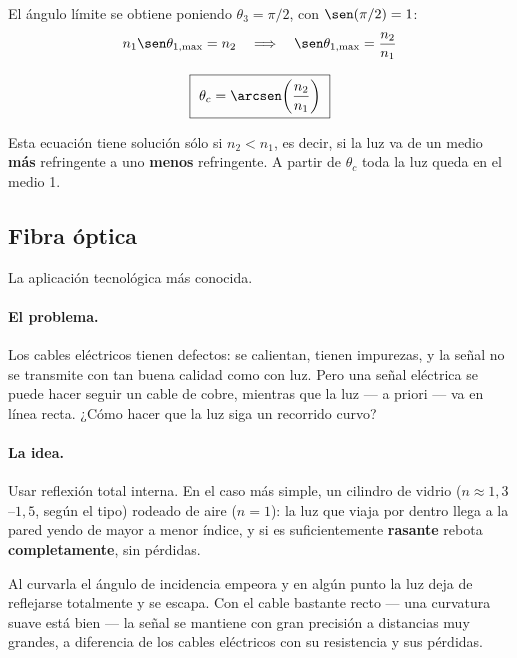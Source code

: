 \documentclass[12pt,a4paper]{article}
\begin{document}
El ángulo límite se obtiene poniendo $\theta_3 = \pi/2$, con $\sen(\pi/2) = 1$:
\[
n_1 \sen\theta_{1,\max} = n_2
\quad\Longrightarrow\quad
\sen\theta_{1,\max} = \frac{n_2}{n_1}
\]

\begin{keybox}
\[
\boxed{\ \theta_c = \arcsen\!\left(\frac{n_2}{n_1}\right)\ }
\]
\end{keybox}

\begin{warnbox}
Esta ecuación tiene solución sólo si $n_2 < n_1$, es decir, si la luz va de un
medio \textbf{más} refringente a uno \textbf{menos} refringente. A partir de
$\theta_c$ toda la luz queda en el medio 1.
\end{warnbox}



\subsection{Fibra óptica}

La aplicación tecnológica más conocida.

\paragraph{El problema.}
Los cables eléctricos tienen defectos: se calientan, tienen impurezas, y la señal
no se transmite con tan buena calidad como con luz. Pero una señal eléctrica se
puede hacer seguir un cable de cobre, mientras que la luz --- a priori --- va en
línea recta. ¿Cómo hacer que la luz siga un recorrido curvo?

\paragraph{La idea.}
Usar reflexión total interna. En el caso más simple, un cilindro de vidrio
($n \approx 1{,}3$--$1{,}5$, según el tipo) rodeado de aire ($n = 1$): la luz que
viaja por dentro llega a la pared yendo de mayor a menor índice, y si es
suficientemente \textbf{rasante} rebota \textbf{completamente}, sin pérdidas.

\begin{warnbox}
Al curvarla el ángulo de incidencia empeora y en algún punto la luz deja de
reflejarse totalmente y se escapa. Con el cable bastante recto --- una curvatura
suave está bien --- la señal se mantiene con gran precisión a distancias muy
grandes, a diferencia de los cables eléctricos con su resistencia y sus pérdidas.
\end{warnbox}
\end{document}
